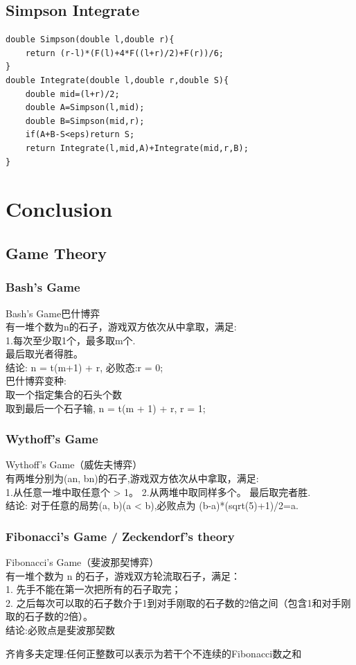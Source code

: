 \documentclass[10pt]{ctexart}
\begin{document}
{{\subsection{Simpson Integrate}
\begin{lstlisting}
double Simpson(double l,double r){
    return (r-l)*(F(l)+4*F((l+r)/2)+F(r))/6;
}
double Integrate(double l,double r,double S){
    double mid=(l+r)/2;
    double A=Simpson(l,mid);
    double B=Simpson(mid,r);
    if(A+B-S<eps)return S;
    return Integrate(l,mid,A)+Integrate(mid,r,B);
}
\end{lstlisting}

\newpage
\section{Conclusion}
\subsection{Game Theory}
\subsubsection{Bash's Game}
Bash's Game巴什博弈\\
有一堆个数为n的石子，游戏双方依次从中拿取，满足:\\
1.每次至少取1个，最多取m个.\\
最后取光者得胜。\\
结论: n = t(m+1) + r, 必败态:r = 0;\\
巴什博弈变种:\\
取一个指定集合的石头个数\\
取到最后一个石子输, n = t(m + 1)  + r, r = 1;\\
\subsubsection{Wythoff’s Game}
Wythoff’s Game（威佐夫博弈）\\
有两堆分别为(an, bn)的石子,游戏双方依次从中拿取，满足:\\
1.从任意一堆中取任意个 > 1。 
2.从两堆中取同样多个。
最后取完者胜.\\
结论: 对于任意的局势(a, b)(a < b),必败点为 (b-a)*(sqrt(5)+1)/2=a. \\
\subsubsection{Fibonacci’s Game / Zeckendorf's theory}
Fibonacci’s Game（斐波那契博弈）\\
有一堆个数为 n 的石子，游戏双方轮流取石子，满足：\\
1. 先手不能在第一次把所有的石子取完；\\
2. 之后每次可以取的石子数介于1到对手刚取的石子数的2倍之间（包含1和对手刚取的石子数的2倍）。\\
结论:必败点是斐波那契数\\
\par
齐肯多夫定理:任何正整数可以表示为若干个不连续的Fibonacci数之和\\
}}
\end{document}
